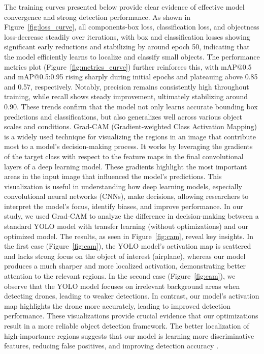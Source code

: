 \documentclass[preprint,review,12pt]{elsarticle}
\begin{document}
The training curves presented below provide clear evidence of effective model convergence and strong detection performance. As shown in Figure~\ref{fig:loss_curve}, all components-box loss, classification loss, and objectness loss-decrease steadily over iterations, with box and classification losses showing significant early reductions and stabilizing by around epoch 50, indicating that the model efficiently learns to localize and classify small objects. The performance metrics plot (Figure~\ref{fig:metrics_curve}) further reinforces this, with mAP@0.5 and mAP@0.5:0.95 rising sharply during initial epochs and plateauing above 0.85 and 0.57, respectively. Notably, precision remains consistently high throughout training, while recall shows steady improvement, ultimately stabilizing around 0.90. These trends confirm that the model not only learns accurate bounding box predictions and classifications, but also generalizes well across various object scales and conditions.
Grad-CAM (Gradient-weighted Class Activation Mapping) is a widely used technique for visualizing the regions in an image that contribute most to a model’s decision-making process. It works by leveraging the gradients of the target class with respect to the feature maps in the final convolutional layers of a deep learning model. These gradients highlight the most important areas in the input image that influenced the model’s predictions. This visualization is useful in understanding how deep learning models, especially convolutional neural networks (CNNs), make decisions, allowing researchers to interpret the model’s focus, identify biases, and improve performance.
In our study, we used Grad-CAM to analyze the difference in decision-making between a standard YOLO model with transfer learning (without optimizations) and our optimized model. The results, as seen in Figure~\ref{fig:cam}, reveal key insights. In the first case (Figure~\ref{fig:cam}), the YOLO model’s activation map is scattered and lacks strong focus on the object of interest (airplane), whereas our model produces a much sharper and more localized activation, demonstrating better attention to the relevant regions. In the second case (Figure~\ref{fig:cam}), we observe that the YOLO model focuses on irrelevant background areas when detecting drones, leading to weaker detections. In contrast, our model’s activation map highlights the drone more accurately, leading to improved detection performance.
These visualizations provide crucial evidence that our optimizations result in a more reliable object detection framework. The better localization of high-importance regions suggests that our model is learning more discriminative features, reducing false positives, and improving detection accuracy  \cite{Wang2020ScoreCAM,Desai2020}. %
\end{document}

